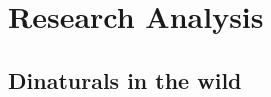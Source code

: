 \documentclass[../Dissertation.tex]{subfiles}
\begin{document}
\section{Research Analysis}
\subsection{Dinaturals in the wild}
\end{document}
